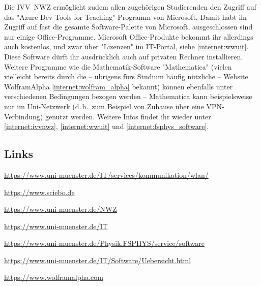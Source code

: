 \begin{multicols}{2}
Die IVV~NWZ ermöglicht zudem allen zugehörigen Studierenden den Zugriff auf das "Azure Dev Tools for Teaching"-Programm von Microsoft.
Damit habt ihr Zugriff auf fast die gesamte Software-Palette von Microsoft, ausgeschlossen sind nur einige Office-Programme. 
Microsoft Office-Produkte bekommt ihr allerdings auch kostenlos, und zwar über "Lizenzen" im IT-Portal, siehe \cref{internet:wwuit}.
Diese Software dürft ihr ausdrücklich auch auf privaten Rechner installieren.
Weitere Programme wie die Mathematik-Software "Mathematica" (vielen vielleicht bereits durch die -- übrigens fürs Studium häufig nützliche -- Website WolframAlpha \cref{internet:wolfram_alpha} bekannt) können ebenfalls unter verschiedenen Bedingungen bezogen werden -- Mathematica kann beispielsweise nur im Uni-Netzwerk (d.\,h.\ zum Beispiel von Zuhause über eine VPN-Verbindung) genutzt werden.
Weitere Infos findet ihr wieder unter \cref{internet:ivvnwz}, \cref{internet:wwuit} und \cref{internet:fsphys_software}.

\subsection{Links}
\begin{flushleft}
	\begin{fibelurl}
		\url{https://www.uni-muenster.de/IT/services/kommunikation/wlan/}
		\label{internet:wlan}
	\end{fibelurl}
	\begin{fibelurl}
		\url{https://www.sciebo.de}
		\label{internet:sciebo}
	\end{fibelurl}
	\begin{fibelurl}
		\url{https://www.uni-muenster.de/NWZ}
		\label{internet:ivvnwz}
	\end{fibelurl}
	\begin{fibelurl}
		\url{https://www.uni-muenster.de/IT}
		\label{internet:wwuit}
	\end{fibelurl}
	\begin{fibelurl}
		\url{https://www.uni-muenster.de/Physik.FSPHYS/service/software}
		\label{internet:fsphys_software}
	\end{fibelurl}
	\begin{fibelurl}
		\url{https://www.uni-muenster.de/IT/Software/Uebersicht.html}
		\label{internet:wwuit_software}
	\end{fibelurl}
	\begin{fibelurl}
		\url{https://www.wolframalpha.com}
		\label{internet:wolfram_alpha}
	\end{fibelurl}
\end{flushleft}


\begin{center}
\end{center}

\end{multicols}

